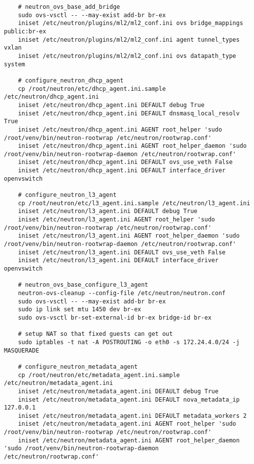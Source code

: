 \documentclass[a4paper,left=1.5cm,right=1.5cm,11pt]{article}
\begin{document}
\begin{lstlisting}
	# neutron_ovs_base_add_bridge
	sudo ovs-vsctl -- --may-exist add-br br-ex
	iniset /etc/neutron/plugins/ml2/ml2_conf.ini ovs bridge_mappings public:br-ex
	iniset /etc/neutron/plugins/ml2/ml2_conf.ini agent tunnel_types vxlan
	iniset /etc/neutron/plugins/ml2/ml2_conf.ini ovs datapath_type system

	# configure_neutron_dhcp_agent
	cp /root/neutron/etc/dhcp_agent.ini.sample /etc/neutron/dhcp_agent.ini
	iniset /etc/neutron/dhcp_agent.ini DEFAULT debug True
	iniset /etc/neutron/dhcp_agent.ini DEFAULT dnsmasq_local_resolv True
	iniset /etc/neutron/dhcp_agent.ini AGENT root_helper 'sudo /root/venv/bin/neutron-rootwrap /etc/neutron/rootwrap.conf'
	iniset /etc/neutron/dhcp_agent.ini AGENT root_helper_daemon 'sudo /root/venv/bin/neutron-rootwrap-daemon /etc/neutron/rootwrap.conf'
	iniset /etc/neutron/dhcp_agent.ini DEFAULT ovs_use_veth False
	iniset /etc/neutron/dhcp_agent.ini DEFAULT interface_driver openvswitch

	# configure_neutron_l3_agent
	cp /root/neutron/etc/l3_agent.ini.sample /etc/neutron/l3_agent.ini
	iniset /etc/neutron/l3_agent.ini DEFAULT debug True
	iniset /etc/neutron/l3_agent.ini AGENT root_helper 'sudo /root/venv/bin/neutron-rootwrap /etc/neutron/rootwrap.conf'
	iniset /etc/neutron/l3_agent.ini AGENT root_helper_daemon 'sudo /root/venv/bin/neutron-rootwrap-daemon /etc/neutron/rootwrap.conf'
	iniset /etc/neutron/l3_agent.ini DEFAULT ovs_use_veth False
	iniset /etc/neutron/l3_agent.ini DEFAULT interface_driver openvswitch
	
	# neutron_ovs_base_configure_l3_agent
	neutron-ovs-cleanup --config-file /etc/neutron/neutron.conf
	sudo ovs-vsctl -- --may-exist add-br br-ex
	sudo ip link set mtu 1450 dev br-ex
	sudo ovs-vsctl br-set-external-id br-ex bridge-id br-ex

	# setup NAT so that fixed guests can get out
	sudo iptables -t nat -A POSTROUTING -o eth0 -s 172.24.4.0/24 -j MASQUERADE

	# configure_neutron_metadata_agent
	cp /root/neutron/etc/metadata_agent.ini.sample /etc/neutron/metadata_agent.ini
	iniset /etc/neutron/metadata_agent.ini DEFAULT debug True
	iniset /etc/neutron/metadata_agent.ini DEFAULT nova_metadata_ip 127.0.0.1
	iniset /etc/neutron/metadata_agent.ini DEFAULT metadata_workers 2
	iniset /etc/neutron/metadata_agent.ini AGENT root_helper 'sudo /root/venv/bin/neutron-rootwrap /etc/neutron/rootwrap.conf'
	iniset /etc/neutron/metadata_agent.ini AGENT root_helper_daemon 'sudo /root/venv/bin/neutron-rootwrap-daemon /etc/neutron/rootwrap.conf'


\end{lstlisting}
\end{document}
